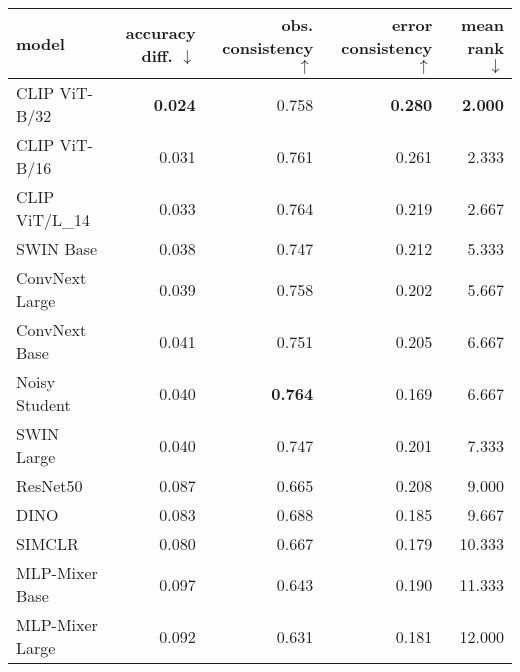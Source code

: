 \begin{tabular}{lrrrr}
\toprule
          model & accuracy diff. $\downarrow$ & obs. consistency $\uparrow$ & error consistency $\uparrow$ & mean rank $\downarrow$ \\
\midrule
  CLIP ViT-B/32 &              \textbf{0.024} &                       0.758 &               \textbf{0.280} &         \textbf{2.000} \\
  CLIP ViT-B/16 &                       0.031 &                       0.761 &                        0.261 &                  2.333 \\
 CLIP ViT/L\_14 &                       0.033 &                       0.764 &                        0.219 &                  2.667 \\
      SWIN Base &                       0.038 &                       0.747 &                        0.212 &                  5.333 \\
 ConvNext Large &                       0.039 &                       0.758 &                        0.202 &                  5.667 \\
  ConvNext Base &                       0.041 &                       0.751 &                        0.205 &                  6.667 \\
  Noisy Student &                       0.040 &              \textbf{0.764} &                        0.169 &                  6.667 \\
     SWIN Large &                       0.040 &                       0.747 &                        0.201 &                  7.333 \\
       ResNet50 &                       0.087 &                       0.665 &                        0.208 &                  9.000 \\
           DINO &                       0.083 &                       0.688 &                        0.185 &                  9.667 \\
         SIMCLR &                       0.080 &                       0.667 &                        0.179 &                 10.333 \\
 MLP-Mixer Base &                       0.097 &                       0.643 &                        0.190 &                 11.333 \\
MLP-Mixer Large &                       0.092 &                       0.631 &                        0.181 &                 12.000 \\
\bottomrule
\end{tabular}

